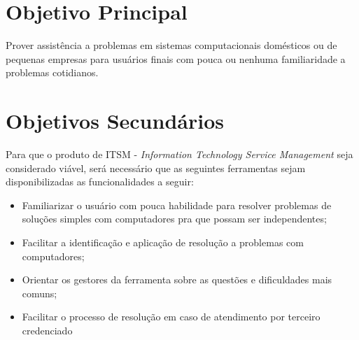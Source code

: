 \documentclass[
    12pt,               %
    openright,          %
    oneside,
    a4paper,            %
    english,            %
    brazil              %
   ]{ifsp-spo-inf-ctds}
\begin{document}
\section{Objetivo Principal}

	Prover assistência a problemas em sistemas computacionais domésticos ou de pequenas empresas para usuários finais com pouca ou nenhuma familiaridade a problemas cotidianos.

\section{Objetivos Secundários}

	Para que o produto de ITSM - \textit{Information Technology Service Management} seja considerado viável, será necessário que as seguintes ferramentas sejam disponibilizadas as funcionalidades a seguir: 
	
	\begin{itemize}
		
		\item
		Familiarizar o usuário com pouca habilidade para resolver problemas de soluções simples com computadores pra que possam ser independentes;
		
		\item
		Facilitar a identificação e aplicação de resolução a problemas com computadores;
		
		\item
		Orientar os gestores da ferramenta sobre as questões e dificuldades mais comuns;
		
		\item 
		Facilitar o processo de resolução em caso de atendimento por terceiro credenciado
		 
	\end{itemize}
\end{document}
